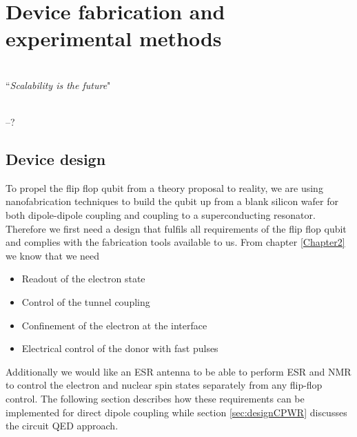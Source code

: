 
\chapter{Device fabrication and experimental methods} %

\label{Chapter5} 

\HRule
\vspace{0.5cm} \hspace{2cm}
\small
\hangindent=4cm
\\
        ``\emph{Scalability is the future}"
\\ \\
\hangindent=4cm
\begin{flushright}
--? \\
\end{flushright}

\vspace{0.5cm}

\noindent \HRule
\clearpage

\section{Device design} \label{sec:deviceDesign}

To propel the flip flop qubit from a theory proposal to reality, we are using nanofabrication techniques to build the qubit up from a blank silicon wafer for both dipole-dipole coupling and coupling to a superconducting resonator. Therefore we first need a design that fulfils all requirements of the flip flop qubit and complies with the fabrication tools available to us. 
From chapter \ref{Chapter2} we know that we need 
\begin{itemize}
\item Readout of the electron state
\item Control of the tunnel coupling 
\item Confinement of the electron at the interface
\item Electrical control of the donor with fast pulses
\end{itemize}

Additionally we would like an ESR antenna to be able to perform ESR and NMR to control the electron and nuclear spin states separately from any flip-flop control.  The following section describes how these requirements can be implemented for direct dipole coupling while section \ref{sec:designCPWR} discusses the circuit QED approach. 

